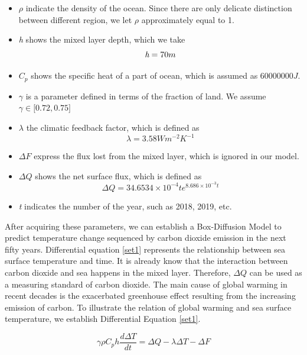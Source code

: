 \documentclass{mcmthesis}
\begin{document}
\begin{itemize}
	\item $\rho$ indicate the density of the ocean. Since there are only delicate distinction between different region, we let $\rho$ approximately equal to 1. 
	\item \emph{h} shows the mixed layer depth, which we take\cite{globalwarming}
		\begin{equation*}
		\emph{h}  = 70m
		\end {equation*}
	\item $C_p$ shows the specific heat of a part of ocean, which is assumed as $60000000J$.
	\item $\gamma$ is a parameter defined in terms of the fraction of land. We assume $\gamma \in \big[0.72,0.75\big]$ \cite{co2dat}
	\item $\lambda$ the climatic feedback factor, which is defined as \cite{globalwarming}
		\begin{equation*}
		\lambda = 3.58 W m^{-2} K^{-1}
		\end {equation*}
	\item  $\Delta F$ express the flux lost from the mixed layer, which is ignored in our model. 
		
	\item $\Delta Q$ shows the net surface flux, which is defined as\cite{modelsol}
		\begin{equation*}
		\Delta Q = 34.6534 \times 10^{-4}te^{8.686\times 10^{-3}t}
		\end {equation*}
	\item \emph{t} indicates the number of the year, such as 2018, 2019, etc.
\end{itemize}
\par
	After acquiring these parameters, we can establish a Box-Diffusion Model\cite{funct} to predict temperature change sequenced by carbon dioxide emission in the next fifty years. Differential equation \ref{set1} represents the relationship between sea surface temperature and time. It is already know that the interaction between carbon dioxide and sea happens in the mixed layer. Therefore, $\Delta Q$ can be used as a measuring standard of carbon dioxide. The main cause of global warming in recent decades is the exacerbated greenhouse effect resulting from the increasing emission of carbon. To illustrate the relation of global warming and sea surface temperature, we establish Differential Equation \ref{set1}.
\begin{spacing}{1.5}
\begin{equation*}\label{set1}
\gamma\rho C_{p} h\frac{d\Delta T}{dt} = \Delta Q - \lambda\Delta T - \Delta F
\end{equation*}
\end{spacing}
\end{document}
